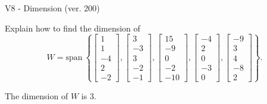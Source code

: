 \begin{exercise}
  \begin{exerciseTitle}V8 - Dimension (ver. 200)\end{exerciseTitle}
  \begin{exerciseStatement}
    Explain how to find the dimension of 
\[W=\mathrm{span}\ \left\{\left[\begin{array}{r}
1 \\
1 \\
-4 \\
2 \\
-2
\end{array}\right] , \left[\begin{array}{r}
3 \\
-3 \\
3 \\
-2 \\
-1
\end{array}\right] , \left[\begin{array}{r}
15 \\
-9 \\
0 \\
-2 \\
-10
\end{array}\right] , \left[\begin{array}{r}
-4 \\
2 \\
0 \\
-3 \\
0
\end{array}\right] , \left[\begin{array}{r}
-9 \\
3 \\
4 \\
-8 \\
2
\end{array}\right]\right\}.\]



  \end{exerciseStatement}
  \begin{exerciseAnswer}
   The dimension of \(W\) is  \(3\).
  


  \end{exerciseAnswer}
\end{exercise}
